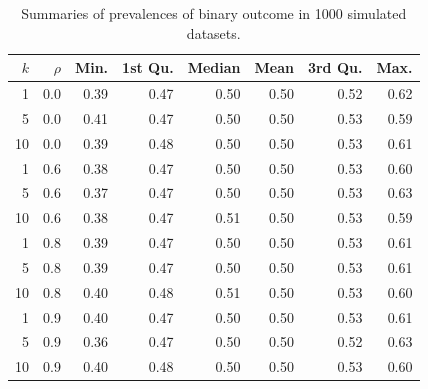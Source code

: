 \begin{table}[ht]
\centering
\caption{Summaries of prevalences of binary outcome in 1000 simulated datasets.} 
\label{tab:prev.bin}
\begin{tabular}{rrrrrrrr}
  \toprule
$k$ & $\rho$ & Min. & 1st Qu. & Median & Mean & 3rd Qu. & Max. \\ 
  \midrule
1 & 0.0 & 0.39 & 0.47 & 0.50 & 0.50 & 0.52 & 0.62 \\ 
  5 & 0.0 & 0.41 & 0.47 & 0.50 & 0.50 & 0.53 & 0.59 \\ 
  10 & 0.0 & 0.39 & 0.48 & 0.50 & 0.50 & 0.53 & 0.61 \\ 
  1 & 0.6 & 0.38 & 0.47 & 0.50 & 0.50 & 0.53 & 0.60 \\ 
  5 & 0.6 & 0.37 & 0.47 & 0.50 & 0.50 & 0.53 & 0.63 \\ 
  10 & 0.6 & 0.38 & 0.47 & 0.51 & 0.50 & 0.53 & 0.59 \\ 
  1 & 0.8 & 0.39 & 0.47 & 0.50 & 0.50 & 0.53 & 0.61 \\ 
  5 & 0.8 & 0.39 & 0.47 & 0.50 & 0.50 & 0.53 & 0.61 \\ 
  10 & 0.8 & 0.40 & 0.48 & 0.51 & 0.50 & 0.53 & 0.60 \\ 
  1 & 0.9 & 0.40 & 0.47 & 0.50 & 0.50 & 0.53 & 0.61 \\ 
  5 & 0.9 & 0.36 & 0.47 & 0.50 & 0.50 & 0.52 & 0.63 \\ 
  10 & 0.9 & 0.40 & 0.48 & 0.50 & 0.50 & 0.53 & 0.60 \\ 
   \bottomrule
\end{tabular}
\end{table}
